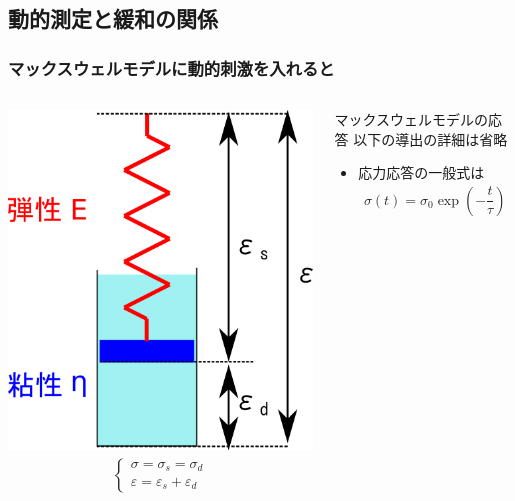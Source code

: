 \documentclass[12pt, dvipdfmx]{beamer}
\begin{document}
\subsection{動的測定と緩和の関係}
\begin{frame}
	\frametitle{マックスウェルモデルに動的刺激を入れると}
		\begin{columns}[c, onlytextwidth]
				\vspace{3mm}
				\includegraphics[width=.9\textwidth]{Maxwell_model.png}
				\begin{align*}
					\begin{cases}
						\sigma = \sigma_s = \sigma_d \\
						\varepsilon = \varepsilon_s + \varepsilon_d
					\end{cases}
				\end{align*}
				\begin{block}{マックスウェルモデルの応答}
					\alert{以下の導出の詳細は省略}
					\begin{itemize}
						\item 応力応答の一般式は
						\vspace{-3mm}
						\begin{align*}
							\sigma(t) = \sigma_0 \exp \left( - \dfrac{t}{\tau} \right)

\end{align*}
\end{itemize}
\end{block}
\end{columns}
\end{frame}
\end{document}

